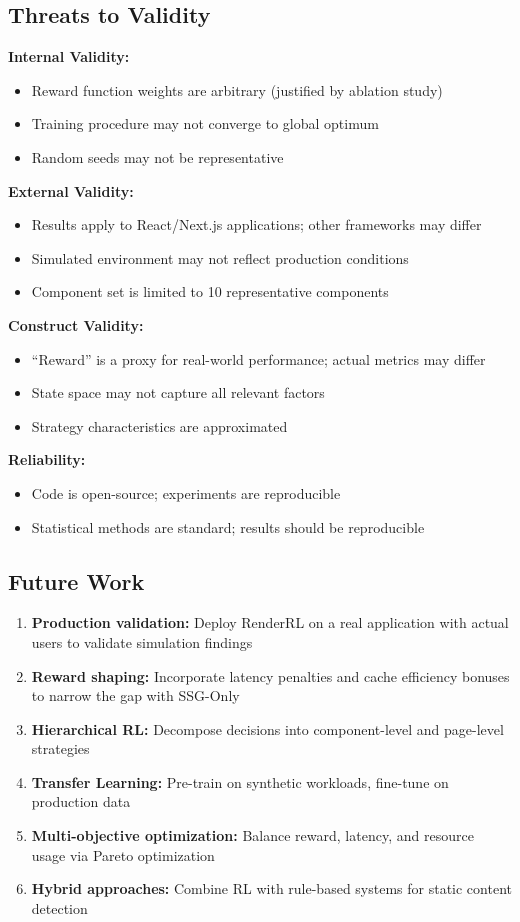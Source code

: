 \documentclass[10pt,twocolumn]{article}
\newcommand{\method}{RenderRL}
\begin{document}
\subsection{Threats to Validity}

\textbf{Internal Validity:}
\begin{itemize}[nosep]
\item Reward function weights are arbitrary (justified by ablation study)
\item Training procedure may not converge to global optimum
\item Random seeds may not be representative
\end{itemize}

\textbf{External Validity:}
\begin{itemize}[nosep]
\item Results apply to React/Next.js applications; other frameworks may differ
\item Simulated environment may not reflect production conditions
\item Component set is limited to 10 representative components
\end{itemize}

\textbf{Construct Validity:}
\begin{itemize}[nosep]
\item ``Reward'' is a proxy for real-world performance; actual metrics may differ
\item State space may not capture all relevant factors
\item Strategy characteristics are approximated
\end{itemize}

\textbf{Reliability:}
\begin{itemize}[nosep]
\item Code is open-source; experiments are reproducible
\item Statistical methods are standard; results should be reproducible
\end{itemize}

\subsection{Future Work}

\begin{enumerate}[nosep]
\item \textbf{Production validation:} Deploy \method{} on a real application with actual users to validate simulation findings
\item \textbf{Reward shaping:} Incorporate latency penalties and cache efficiency bonuses to narrow the gap with SSG-Only
\item \textbf{Hierarchical RL:} Decompose decisions into component-level and page-level strategies
\item \textbf{Transfer Learning:} Pre-train on synthetic workloads, fine-tune on production data
\item \textbf{Multi-objective optimization:} Balance reward, latency, and resource usage via Pareto optimization
\item \textbf{Hybrid approaches:} Combine RL with rule-based systems for static content detection
\end{enumerate}
\end{document}
